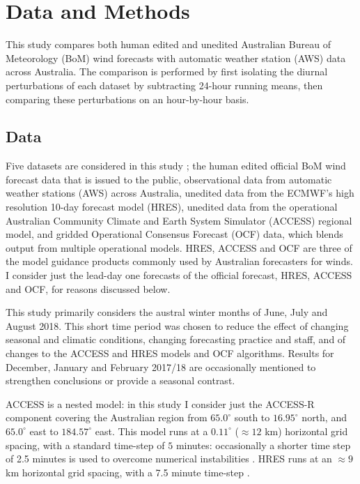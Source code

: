 \documentclass{ametsoc}
\begin{document}
\section{Data and Methods} \label{Sec:Methods}
This study compares both human edited and unedited Australian Bureau of Meteorology (BoM) wind forecasts with automatic weather station (AWS) data across Australia. The comparison is performed by first isolating the diurnal perturbations of each dataset by subtracting 24-hour running means, then comparing these perturbations on an hour-by-hour basis.

\subsection{Data}
Five datasets are considered in this study \citep{shortData19}; the human edited official BoM wind forecast data that is issued to the public, observational data from automatic weather stations (AWS) across Australia, unedited data from the ECMWF's high resolution 10-day forecast model (HRES), unedited data from the operational Australian Community Climate and Earth System Simulator (ACCESS) regional model, and gridded Operational Consensus Forecast (OCF) data, which blends output from multiple operational models. HRES, ACCESS and OCF are three of the model guidance products commonly used by Australian forecasters for winds. I consider just the lead-day one forecasts of the official forecast, HRES, ACCESS and OCF, for reasons discussed below. 

This study primarily considers the austral winter months of June, July and August 2018. This short time period was chosen to reduce the effect of changing seasonal and climatic conditions, changing forecasting practice and staff, and of changes to the ACCESS and HRES models and OCF algorithms. Results for December, January and February 2017/18 are occasionally mentioned to strengthen conclusions or provide a seasonal contrast. 

ACCESS is a nested model: in this study I consider just the ACCESS-R component covering the Australian region from $65.0^\circ$ south to $16.95^\circ$ north, and $65.0^\circ$ east to $184.57^\circ$ east. This model runs at a $0.11^\circ$ ($\approx 12$ km) horizontal grid spacing, with a standard time-step of $5$ minutes: occasionally a shorter time step of 2.5 minutes is used to overcome numerical instabilities \citep{bom16}. HRES runs at an $\approx 9$ km horizontal grid spacing, with a 7.5 minute time-step \citep{ecmwf19c}. 
\end{document}
